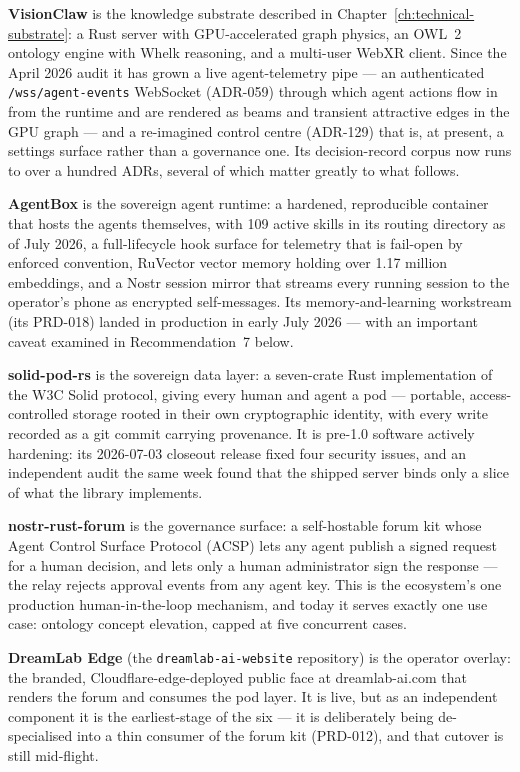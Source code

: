 \textbf{VisionClaw} is the knowledge substrate described in Chapter~\ref{ch:technical-substrate}: a Rust server with GPU-accelerated graph physics, an OWL~2 ontology engine with Whelk reasoning, and a multi-user WebXR client. Since the April 2026 audit it has grown a live agent-telemetry pipe --- an authenticated \texttt{/wss/agent-events} WebSocket (ADR-059) through which agent actions flow in from the runtime and are rendered as beams and transient attractive edges in the GPU graph --- and a re-imagined control centre (ADR-129) that is, at present, a settings surface rather than a governance one. Its decision-record corpus now runs to over a hundred ADRs, several of which matter greatly to what follows.

\textbf{AgentBox} is the sovereign agent runtime: a hardened, reproducible container that hosts the agents themselves, with 109 active skills in its routing directory as of July 2026, a full-lifecycle hook surface for telemetry that is fail-open by enforced convention, RuVector vector memory holding over 1.17 million embeddings, and a Nostr session mirror that streams every running session to the operator's phone as encrypted self-messages. Its memory-and-learning workstream (its PRD-018) landed in production in early July 2026 --- with an important caveat examined in Recommendation~7 below.

\textbf{solid-pod-rs} is the sovereign data layer: a seven-crate Rust implementation of the W3C Solid protocol, giving every human and agent a pod --- portable, access-controlled storage rooted in their own cryptographic identity, with every write recorded as a git commit carrying provenance. It is pre-1.0 software actively hardening: its 2026-07-03 closeout release fixed four security issues, and an independent audit the same week found that the shipped server binds only a slice of what the library implements.

\textbf{nostr-rust-forum} is the governance surface: a self-hostable forum kit whose Agent Control Surface Protocol (ACSP) lets any agent publish a signed request for a human decision, and lets only a human administrator sign the response --- the relay rejects approval events from any agent key. This is the ecosystem's one production human-in-the-loop mechanism, and today it serves exactly one use case: ontology concept elevation, capped at five concurrent cases.

\textbf{DreamLab Edge} (the \texttt{dreamlab-ai-website} repository) is the operator overlay: the branded, Cloudflare-edge-deployed public face at dreamlab-ai.com that renders the forum and consumes the pod layer. It is live, but as an independent component it is the earliest-stage of the six --- it is deliberately being de-specialised into a thin consumer of the forum kit (PRD-012), and that cutover is still mid-flight.

